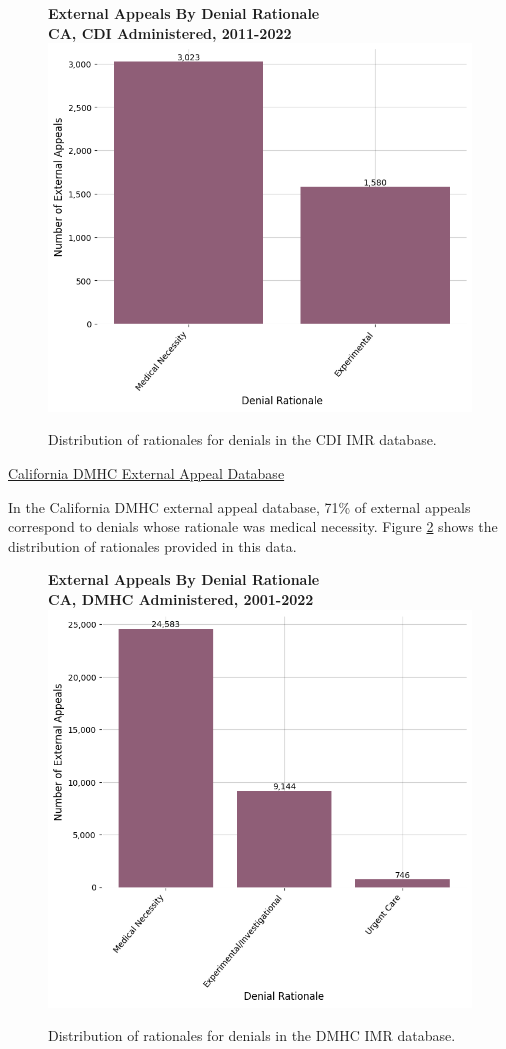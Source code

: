 \documentclass[12pt, a4paper,twoside,parskip=full]{report}
\theoremstyle{plain} %
\theoremstyle{definition} %
\theoremstyle{remark} %
\numberwithin{equation}{chapter}
\begin{document}
		\begin{figure}[h!]
			\centering
			\textbf{External Appeals By Denial Rationale}\\
			\textbf{CA, CDI Administered, 2011-2022}\\
			\includegraphics[width=.8\textwidth]{images/ca_doi_external_appeals/external_appeals_by_denial_reason.png}
			\caption{Distribution of rationales for denials in the CDI IMR database.}
			\label{cacdieexternalappealsbyrationale}
		\end{figure}
		\clearpage
	
		\underline{California DMHC External Appeal Database}
	
		In the California DMHC external appeal database, 71\% of external appeals correspond to denials whose rationale was medical necessity. Figure \ref{cadmhceexternalappealsbyrationale} shows the distribution of rationales provided in this data.
		
		\begin{figure}[h!]
			\centering
			\textbf{External Appeals By Denial Rationale}\\
			\textbf{CA, DMHC Administered, 2001-2022}\\
			\includegraphics[width=.8\textwidth]{images/ca_dmhc_external_appeals/external_appeals_by_denial_reason.png}
			\caption{Distribution of rationales for denials in the DMHC IMR database.}
			\label{cadmhceexternalappealsbyrationale}
		\end{figure}
	
\end{document}

